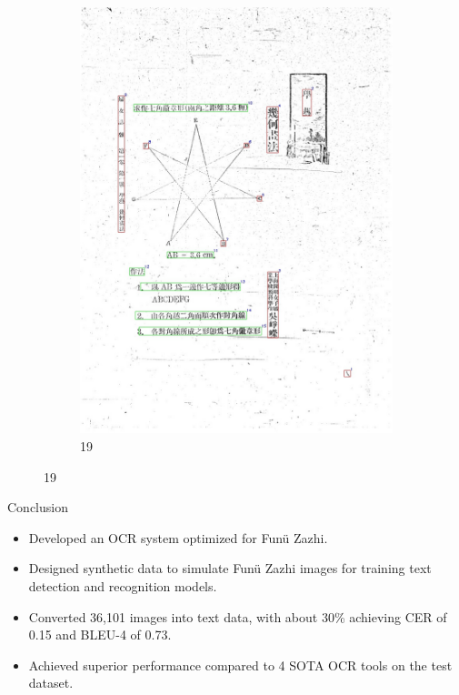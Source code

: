 \documentclass{beamer}
\begin{document}
\begin{frame}
\begin{figure}[htbp]
\begin{subfigure}[b]{0.3\linewidth}
            \includegraphics[height=1.35\linewidth]{./figures/samples/19.jpg}
            \caption{19}
            \label{fig:ours_19}
        \end{subfigure}
        \label{fig:challenging_cases}
    \end{figure}
\end{frame}

\begin{frame}
    \begin{center}
        \Large{Conclusion}
    \end{center}
    \begin{itemize}
        \item Developed an OCR system optimized for Funü Zazhi.
        \item Designed synthetic data to simulate Funü Zazhi images for training text detection and recognition models.
        \item Converted 36,101 images into text data, with about 30\% achieving CER of 0.15 and BLEU-4 of 0.73.
        \item Achieved superior performance compared to 4 SOTA OCR tools on the test dataset.
    \end{itemize}
\end{frame}
\end{document}
